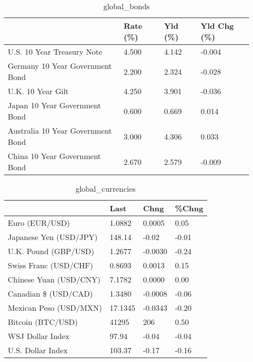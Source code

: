 \documentclass{article}%
\begin{document}
%


\begin{table}[htbp]%
\caption{global\_bonds}%
\centering%
\begin{adjustbox}{width=1\textwidth}%
\begin{tabular}{llll}
\toprule
                                  & Rate (\%) & Yld (\%) & Yld Chg (\%) \\
\midrule
       U.S. 10 Year Treasury Note &    4.500 &   4.142 &      -0.004 \\
  Germany 10 Year Government Bond &    2.200 &   2.324 &      -0.028 \\
                U.K. 10 Year Gilt &    4.250 &   3.901 &      -0.036 \\
    Japan 10 Year Government Bond &    0.600 &   0.669 &       0.014 \\
Australia 10 Year Government Bond &    3.000 &   4.306 &       0.033 \\
    China 10 Year Government Bond &    2.670 &   2.579 &      -0.009 \\
\bottomrule
\end{tabular}
%
\end{adjustbox}%
\end{table}

%


\begin{table}[htbp]%
\caption{global\_currencies}%
\centering%
\begin{adjustbox}{width=1\textwidth}%
\begin{tabular}{llll}
\toprule
                       &    Last &    Chng & \%Chng \\
\midrule
        Euro (EUR/USD) &  1.0882 &  0.0005 &  0.05 \\
Japanese Yen (USD/JPY) &  148.14 &   -0.02 & -0.01 \\
  U.K. Pound (GBP/USD) &  1.2677 & -0.0030 & -0.24 \\
 Swiss Franc (USD/CHF) &  0.8693 &  0.0013 &  0.15 \\
Chinese Yuan (USD/CNY) &  7.1782 &  0.0000 &  0.00 \\
  Canadian \$ (USD/CAD) &  1.3480 & -0.0008 & -0.06 \\
Mexican Peso (USD/MXN) & 17.1345 & -0.0343 & -0.20 \\
     Bitcoin (BTC/USD) &   41295 &     206 &  0.50 \\
      WSJ Dollar Index &   97.94 &   -0.04 & -0.04 \\
     U.S. Dollar Index &  103.37 &   -0.17 & -0.16 \\
\bottomrule
\end{tabular}
%
\end{adjustbox}%
\end{table}
\end{document}
